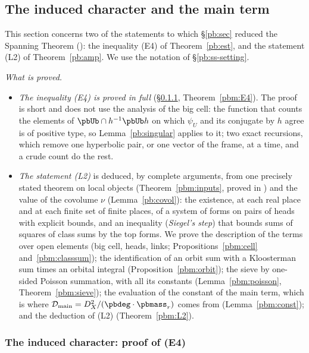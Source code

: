 \documentclass[10pt]{amsart}
\theoremstyle{definition}
\theoremstyle{remark}
\providecommand{\auDX}{D_X}
\providecommand{\pbDmain}{\mathcal D_{\mathrm{main}}}
\begin{document}
\subsection{The induced character and the main term}\label{pbm:sec}

This section concerns two of the statements to which \S\ref{pb:sec} reduced the Spanning Theorem ({\cite[Theorem~14.14]{P46}}):
the inequality \textup{(E4)} of Theorem~\ref{pb:est}, and the statement \textup{(L2)} of
Theorem~\ref{pb:amp}. We use the notation of \S\ref{pb:ss-setting}.

\emph{What is proved.}
\begin{itemize}
\item[(I)] \emph{The inequality \textup{(E4)} is proved in full} (\S\ref{pbm:ss-E4},
Theorem~\ref{pbm:E4}). The proof is short and does not use the analysis of the big cell: the
function that counts the elements of $\pbUb\cap h^{-1}\pbUb h$ on which $\psi_U$ and its conjugate
by $h$ agree is of positive type, so Lemma~\ref{pb:singular} applies to it; two exact recursions,
which remove one hyperbolic pair, or one vector of the frame, at a time, and a crude count do the
rest.
\item[(II)] \emph{The statement \textup{(L2)}} is deduced, by complete arguments, from one precisely
stated theorem on local objects (Theorem~\ref{pbm:inputs}, proved in {\cite[\S\S2--6]{P52}})
and the value of the covolume $\nu$ (Lemma~\ref{pb:covol}): the
existence, at each real place and at each finite set of finite places, of a system of forms on
pairs of heads with explicit bounds, and an inequality (\emph{Siegel's step}) that bounds sums of
squares of class sums by the top forms. We prove the description of the terms over
open elements (big cell, heads, links; Propositions~\ref{pbm:cell} and~\ref{pbm:classsum}); the
identification of an orbit sum with a Kloosterman sum times an orbital integral
(Proposition~\ref{pbm:orbit}); the sieve by one-sided Poisson summation, with all its constants
(Lemma~\ref{pbm:poisson}, Theorem~\ref{pbm:sieve}); the evaluation of the constant of the main
term, which is where $\pbDmain=\auDX^2/(\pbdeg\cdot\pbmass_r)$ comes from (Lemma~\ref{pbm:const});
and the deduction of \textup{(L2)} (Theorem~\ref{pbm:L2}).
\end{itemize}
\subsubsection{The induced character: proof of \textup{(E4)}}\label{pbm:ss-E4}
\end{document}
